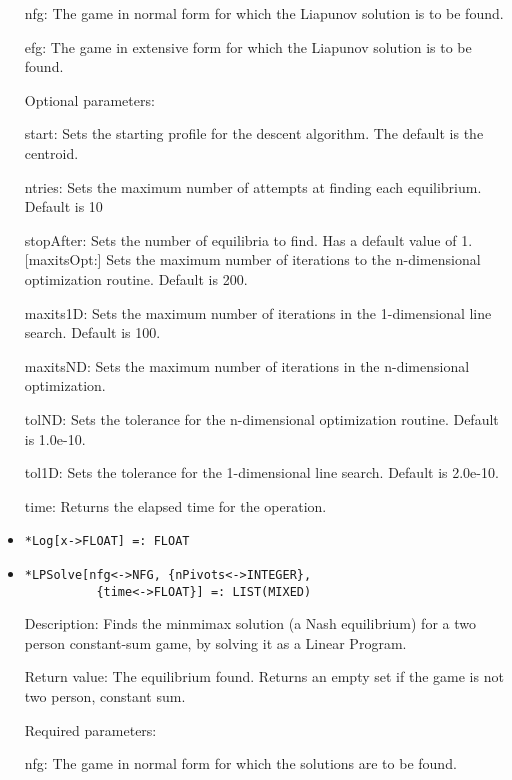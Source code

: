 \begin{itemize}
\bd
\item
[nfg:] The game in normal form for which the Liapunov solution is to
be found.
\item
[efg:] The game in extensive form for which the Liapunov solution is
to be found.
\ed

\item
[Optional parameters:]\hfil\null

\bd
\item
[start:] Sets the starting profile for the descent algorithm.  The
default is the centroid.
\item
[ntries:] Sets the maximum number of attempts at finding each
equilibrium. Default is 10
\item
[stopAfter:] Sets the number of equilibria to find.  Has a default
value of 1.  [maxitsOpt:] Sets the maximum number of iterations to the
n-dimensional optimization routine.  Default is 200.
\item
[maxits1D:] Sets the maximum number of iterations in the
1-dimensional line search.  Default is 100.
\item
[maxitsND:] Sets the maximum number of iterations in the
n-dimensional optimization.  
\item
[tolND:] Sets the tolerance for the n-dimensional optimization
routine.  Default is 1.0e-10.
\item
[tol1D:] Sets the tolerance for the 1-dimensional line search.
Default is 2.0e-10.
\item
[time:] Returns the elapsed time for the operation.
\ed
\ed

\item
\protect \large \begin{verbatim}
*Log[x->FLOAT] =: FLOAT
\end{verbatim} \normalsize

\item
\protect \large \begin{verbatim}
*LPSolve[nfg<->NFG, {nPivots<->INTEGER},
          {time<->FLOAT}] =: LIST(MIXED)
\end{verbatim}\normalsize

\bd
\item
[Description:] Finds the minmimax solution (a Nash equilibrium) for a
two person constant-sum game, by solving it as a Linear Program.
\item
[Return value:] The equilibrium found.  Returns an empty set if the
game is not two person, constant sum. 
\item
[Required parameters:]
\bd
\item
[nfg:] The game in normal form for which the solutions are to be found.  
\ed


\end{itemize}
